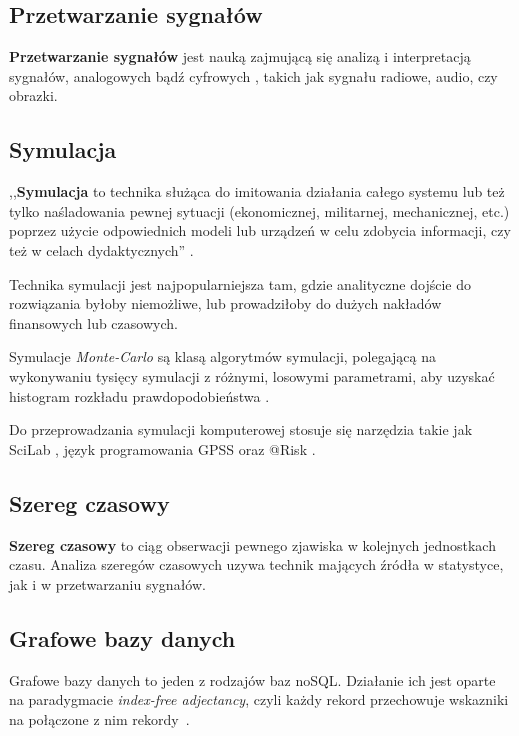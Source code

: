 \documentclass[twocolumn]{svjour3}          %
\begin{document}
\subsection{Przetwarzanie sygnałów}
\label{sub:przetwarzanie_sygnalow}
\textbf{Przetwarzanie sygnałów} jest nauką zajmującą się analizą i interpretacją sygnałów, analogowych bądź cyfrowych \cite{smith97}, takich jak sygnału radiowe, audio, czy obrazki.

\subsection{Symulacja}
\label{sub:symulacja}
,,\textbf{Symulacja} to technika służąca do imitowania działania całego systemu lub też tylko naśladowania pewnej sytuacji (ekonomicznej, militarnej, mechanicznej, etc.) poprzez użycie odpowiednich modeli lub urządzeń w celu zdobycia informacji, czy też w celach dydaktycznych'' \cite{www:symulacja}.

Technika symulacji jest najpopularniejsza tam, gdzie analityczne dojście do rozwiązania byłoby niemożliwe, lub prowadziłoby do dużych nakładów finansowych lub czasowych.

Symulacje \textit{Monte-Carlo} są klasą algorytmów symulacji, polegającą na wykonywaniu tysięcy symulacji z różnymi, losowymi parametrami, aby uzyskać histogram rozkładu prawdopodobieństwa \cite{math:monte-carlo}.

Do przeprowadzania symulacji komputerowej stosuje się narzędzia takie jak SciLab \cite{www:scilab}, język programowania GPSS \cite{www:gpss} oraz @Risk \cite{www:risk}.

\subsection{Szereg czasowy}
\label{sub:szereg_czasowy}
\textbf{Szereg czasowy} to ciąg obserwacji pewnego zjawiska w kolejnych jednostkach czasu. Analiza szeregów czasowych uzywa technik mających źródła w statystyce, jak i w przetwarzaniu sygnałów.

\subsection{Grafowe bazy danych}
\label{sub:grafowe_bazy_danych}
Grafowe bazy danych to jeden z rodzajów baz noSQL. Działanie ich jest oparte na paradygmacie \emph{index-free adjectancy}, czyli każdy rekord przechowuje wskazniki na połączone z nim rekordy~\cite{mizgajski13}.
\end{document}

